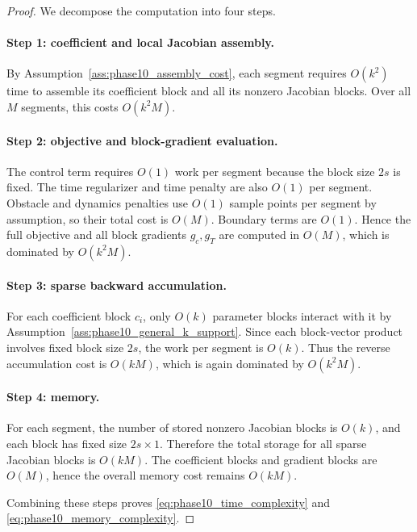 \begin{proof}
We decompose the computation into four steps.

\paragraph{Step 1: coefficient and local Jacobian assembly.}
By Assumption~\ref{ass:phase10_assembly_cost}, each segment requires \(O(k^2)\) time to assemble its coefficient block and all its nonzero Jacobian blocks.
Over all \(M\) segments, this costs \(O(k^2M)\).

\paragraph{Step 2: objective and block-gradient evaluation.}
The control term requires \(O(1)\) work per segment because the block size \(2s\) is fixed.
The time regularizer and time penalty are also \(O(1)\) per segment.
Obstacle and dynamics penalties use \(O(1)\) sample points per segment by assumption, so their total cost is \(O(M)\).
Boundary terms are \(O(1)\).
Hence the full objective and all block gradients \(g_c,g_T\) are computed in \(O(M)\), which is dominated by \(O(k^2M)\).

\paragraph{Step 3: sparse backward accumulation.}
For each coefficient block \(c_i\), only \(O(k)\) parameter blocks interact with it by Assumption~\ref{ass:phase10_general_k_support}.
Since each block-vector product involves fixed block size \(2s\), the work per segment is \(O(k)\).
Thus the reverse accumulation cost is \(O(kM)\), which is again dominated by \(O(k^2M)\).

\paragraph{Step 4: memory.}
For each segment, the number of stored nonzero Jacobian blocks is \(O(k)\), and each block has fixed size \(2s\times 1\).
Therefore the total storage for all sparse Jacobian blocks is \(O(kM)\).
The coefficient blocks and gradient blocks are \(O(M)\), hence the overall memory cost remains \(O(kM)\).

Combining these steps proves \eqref{eq:phase10_time_complexity} and \eqref{eq:phase10_memory_complexity}.
\end{proof}

